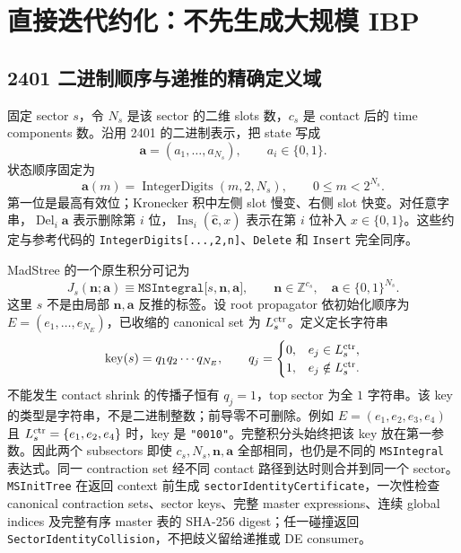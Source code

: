 \documentclass[11pt,a4paper]{ctexart}
\begin{document}
\section{直接迭代约化：不先生成大规模 IBP}

\subsection{2401 二进制顺序与递推的精确定义域}

固定 sector $s$，令 $N_s$ 是该 sector 的二维 slots 数，$c_s$ 是 contact 后的 time components 数。沿用 2401 的二进制表示，把 state 写成
\begin{equation}
 \bm a=(a_1,\ldots,a_{N_s}),
 \qquad a_i\in\{0,1\}.
\end{equation}
状态顺序固定为
\begin{equation}
 \bm a(m)=\operatorname{IntegerDigits}(m,2,N_s),
 \qquad 0\leq m<2^{N_s}.
 \label{eq:binary-state-order}
\end{equation}
第一位是最高有效位；Kronecker 积中左侧 slot 慢变、右侧 slot 快变。对任意字串，$\operatorname{Del}_i\bm a$ 表示删除第 $i$ 位，$\operatorname{Ins}_i(\widehat{\bm c},x)$ 表示在第 $i$ 位补入 $x\in\{0,1\}$。这些约定与参考代码的 \texttt{IntegerDigits[...,2,n]}、\texttt{Delete} 和 \texttt{Insert} 完全同序。

MadStree 的一个原生积分可记为
\begin{equation}
 J_s(\bm n;\bm a)
 \equiv\texttt{MSIntegral[}s,\bm n,\bm a\texttt{]},
 \qquad
 \bm n\in\mathbb Z^{c_s},
 \quad
 \bm a\in\{0,1\}^{N_s}.
 \label{eq:MSIntegral-domain}
\end{equation}
这里 $s$ 不是由局部 $\bm n,\bm a$ 反推的标签。设 root propagator 依初始化顺序为
$E=(e_1,\ldots,e_{N_E})$，已收缩的 canonical set 为 $L_s^{\rm ctr}$。定义定长字符串
\begin{equation}
 \operatorname{key}(s)=q_1q_2\cdots q_{N_E},\qquad
 q_j=\begin{cases}0,&e_j\in L_s^{\rm ctr},\\1,&e_j\notin L_s^{\rm ctr}.
 \end{cases}
 \label{eq:sector-bit-string-key}
\end{equation}
不能发生 contact shrink 的传播子恒有 $q_j=1$，top sector 为全 $1$ 字符串。该 key 的类型是字符串，不是二进制整数；前导零不可删除。例如 $E=(e_1,e_2,e_3,e_4)$ 且 $L_s^{\rm ctr}=\{e_1,e_2,e_4\}$ 时，key 是 \texttt{"0010"}。完整积分头始终把该 key 放在第一参数。因此两个 subsectors 即使 $c_s,N_s,\bm n,\bm a$ 全部相同，也仍是不同的
\texttt{MSIntegral} 表达式。同一 contraction set 经不同 contact 路径到达时则合并到同一个 sector。\texttt{MSInitTree} 在返回 context 前生成
\texttt{sectorIdentityCertificate}，一次性检查 canonical contraction sets、sector keys、完整 master expressions、连续 global indices 及完整有序 master 表的 SHA-256 digest；任一碰撞返回
\texttt{SectorIdentityCollision}，不把歧义留给递推或 DE consumer。
\end{document}
